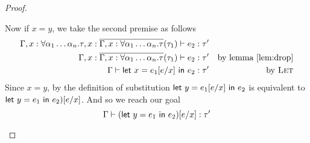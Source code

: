 \begin{proof}
\begin{description}
    Now if $x = y$, we take the second premise as follows
    \begin{align*}
      \Gamma , x : \forall \alpha_1\ldots\alpha_n . \tau , x : \overline{\Gamma, x : \forall\alpha_1\ldots\alpha_n . \tau}(\tau_1)
      \vdash e_2 : \tau' \\
      \Gamma , x : \overline{\Gamma, x : \forall\alpha_1\ldots\alpha_n . \tau}(\tau_1) \vdash e_2 : \tau' &&
                                                                \text{by
                                                                lemma~\ref{lem:drop}}
      \\
      \Gamma \vdash \mathsf{let} \ x = e_1[e / x] \ \mathsf{in} \ e_2 : \tau' && \text{by \textsc{Let}}
    \end{align*}
    Since $x = y$, by the definition of substitution
    $\mathsf{let} \ y=e_1[e/x] \ \mathsf{in} \ e_2$ is equivalent to $\mathsf{let} \ y=e_1 \ \mathsf{in} \ e_2)[e/x]$.
    And so we reach our goal
    \[\Gamma \vdash (\mathsf{let} \ y = e_1 \ \mathsf{in} \ e_2)[e/x] : \tau'\]


\end{description}
\end{proof}
